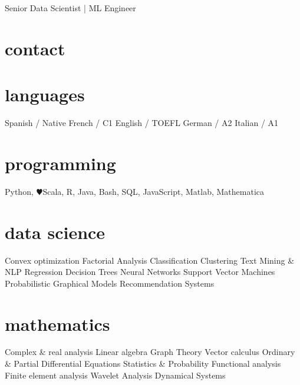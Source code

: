\documentclass[]{friggeri-cv}
\begin{document}
       {Senior Data Scientist | ML Engineer}


\begin{aside}
  \section{contact} 
  \makecvheader
  \section{languages}
    Spanish / Native
    French / C1
    English / TOEFL
    German / A2
    Italian / A1
  \section{programming}
    Python, {\color{red}$\varheartsuit$}Scala, 
    R, Java,  
    Bash, SQL, %
    JavaScript, %
    Matlab, Mathematica
   \section{data science}
   Convex optimization
   Factorial Analysis
   Classification
   Clustering
   Text Mining \& NLP
   Regression
   Decision Trees
   Neural Networks
   Support Vector Machines
   Probabilistic Graphical Models
   Recommendation Systems
   \section{mathematics}  
   Complex \& real analysis
   Linear algebra
   Graph Theory
   Vector calculus
   Ordinary \& Partial Differential Equations
   Statistics \& Probability
   Functional analysis
   Finite element analysis
   Wavelet Analysis
   Dynamical Systems
\end{aside}
\end{document}
